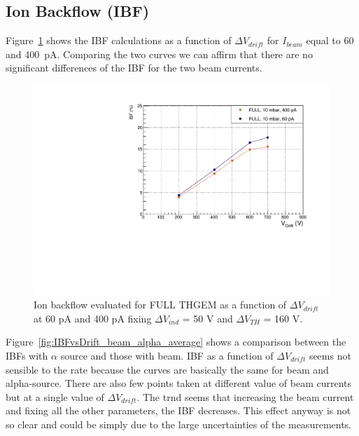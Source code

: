 \documentclass[a4paper, 11 pt]{report}
\newcommand{\Vind}{$\Delta V_{ind}$}
\newcommand{\Vthgem}{$\Delta V_{TH}$}
\newcommand{\Vdrift}{$ \Delta V_{drift}$}
\newcommand{\ibeam}{$I_{beam}$}
\begin{document}

\subsection{Ion Backflow  (IBF)}
Figure~\ref{fig:IBFvsDrift_withBeam} shows the IBF calculations as a function of \Vdrift{} for \ibeam{} equal to 60 and 400~pA. 
Comparing the two curves we can affirm that there are no significant differences of the
IBF for the two beam currents. 

\begin{figure}[htbp]
	\centering
	\includegraphics[width=\textwidth]{Immagini/IBFvsDrift_withBeam.pdf}
	\caption{Ion backflow evaluated for FULL THGEM as a function of \Vdrift{} at 60 pA and 400 pA fixing \Vind{} = 50 V and \Vthgem{} = 160 V.}
	\label{fig:IBFvsDrift_withBeam}
\end{figure}

Figure~\ref{fig:IBFvsDrift_beam_alpha_average} shows a comparison between the IBFs with $\alpha$ 
source and those with beam. 
IBF as a function of \Vdrift{} seems not sensible to the rate because the curves are basically the same
for beam and alpha-source.
There are also few points taken at different value of beam currents but at a single value of \Vdrift.
The trnd seems that increasing the beam current and fixing all the other parameters, the IBF decreases. 
This effect anyway is not so clear and could be simply due to the large uncertainties of the 
measurements.
\end{document}
